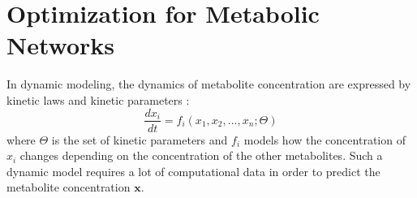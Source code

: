 \section{Optimization for Metabolic Networks} \label{section:optimization_gems}
In dynamic modeling, the dynamics of metabolite concentration are expressed by kinetic laws and kinetic parameters \cite{intro_computational_systems_biology}: 
\begin{equation} \label{Eq:dynamic_model}
    \frac{dx_i}{dt} = f_i(x_1, x_2, ..., x_n; \Theta)
\end{equation}
 where $\Theta$ is the set of kinetic parameters and $f_i$ models how the concentration of $x_i$ changes depending on the concentration of the other metabolites. Such a dynamic model requires a lot of computational data in order to predict the metabolite concentration $\mathbf x$.

